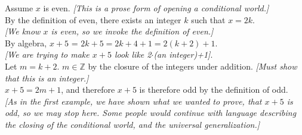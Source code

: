 \documentclass[10pt]{article}
\newcommand{\Z}{\mathbb{Z}}
\begin{document}
Assume $x$ is even. \hfill \textit{[This is a prose form of opening a conditional world.]}\\

By the definition of even, there exists an integer $k$ such that $x=2k$.
\\ \phantom{.} \hfill \textit{[We know $x$ is even, so we invoke the definition of even.]}\\

By algebra, $x+5$ = $2k+5 = 2k+4 +1 = 2(k+2)+1$. \\ \phantom{.} \hfill \textit{[We are trying to make $x+5$ look like 2$\cdot$(an integer)+1]}.\\

Let $m=k+2$.  $m \in \Z$ by the closure of the integers under addition. \hfill \textit{[Must show that this is an integer.]}\\

$x+5=2m+1$, and therefore $x+5$ is therefore odd by the definition of odd. \\

\textit{[As in the first example, we have shown what we wanted to prove, that $x+5$ is odd, so we may stop here.  Some people would continue with 
language describing the closing of the conditional world, and the universal generalization.]}\\
\end{document}

